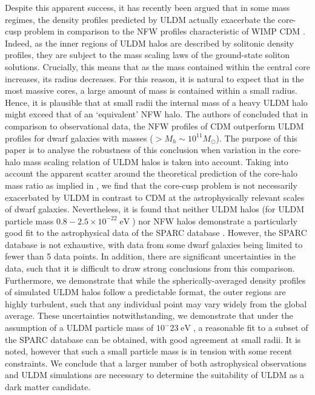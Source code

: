 \documentclass[a4paper,11pt]{article}
\begin{document}
Despite this apparent success, it has recently been argued that in some mass regimes, the density profiles predicted by ULDM actually exacerbate the core-cusp problem in comparison to the NFW profiles characteristic of WIMP CDM \cite{Robles:2018fur}. Indeed, as the inner regions of ULDM halos are described by solitonic density profiles, they are subject to the mass scaling laws of the ground-state soliton solutions. Crucially, this means that as the mass contained within the central core increases, its radius decreases. For this reason, it is natural to expect that in the most massive cores, a large amount of mass is contained within a small radius. Hence, it is plausible that at small radii the internal mass of a heavy ULDM halo might exceed that of an `equivalent' NFW halo. The authors of \cite{Robles:2018fur} concluded that in comparison to observational data, the NFW profiles of CDM outperform ULDM profiles for dwarf galaxies with masses ($> M_h \sim 10^{11} M_{\odot}$). The purpose of this paper is to analyse the robustness of this conclusion when variation in the core-halo mass scaling relation of ULDM halos is taken into account. Taking into account the apparent scatter around the theoretical prediction of the core-halo mass ratio as implied in \cite{Schive:2014hza}, we find that the core-cusp problem is not necessarily exacerbated by ULDM in contrast to CDM at the astrophysically relevant scales of dwarf galaxies. Nevertheless, it is found that neither ULDM halos (for ULDM particle mass $0.8-2.5\times 10^{-22} \operatorname{eV}$)
nor NFW halos demonstrate a particularly good fit to the astrophysical data of the SPARC database \cite{Lelli:2016zqa}. However, the SPARC database is not exhaustive, with data from some dwarf galaxies being limited to fewer than 5 data points. In addition, there are significant uncertainties in the data, such that it is difficult to draw strong conclusions from this comparison. Furthermore, we demonstrate that while the spherically-averaged density profiles of simulated ULDM halos follow a predictable format, the outer regions are highly turbulent, such that any individual point may vary widely from the global average.
These uncertainties notwithstanding, we demonstrate that under the assumption of a ULDM particle mass of $10^-{23}\operatorname{eV}$, a reasonable fit to a subset of the SPARC database can be obtained, with good agreement at small radii. It is noted, however that such a small particle mass is in tension with some recent constraints. We conclude that a larger number of both astrophysical observations and ULDM simulations are necessary to determine the suitability of ULDM as a dark matter candidate.
\end{document}
